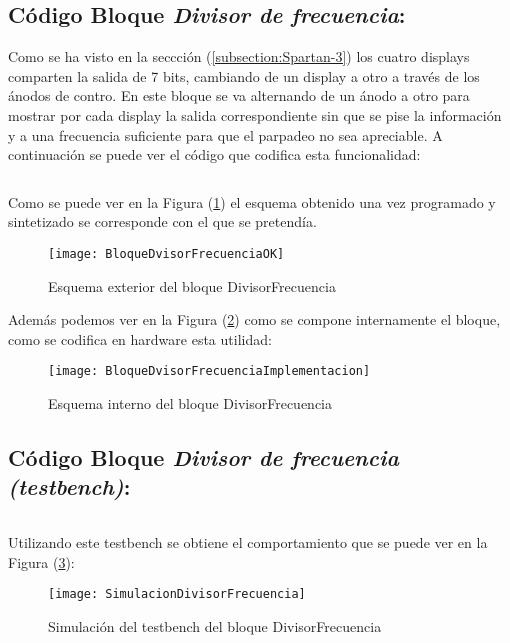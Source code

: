 \subsection{Código Bloque \textit{Divisor de frecuencia}:} \label{code:DivisorFrecuencia}
	Como se ha visto en la seccción (\ref{subsection:Spartan-3}) los cuatro displays comparten la salida de 7 bits, cambiando de un display a otro a través de los ánodos de contro. En este bloque se va alternando de un ánodo a otro para mostrar por cada display la salida correspondiente sin que se pise la información y a una frecuencia suficiente para que el parpadeo no sea apreciable. A continuación se puede ver el código que codifica esta funcionalidad: \\ 

	\inputminted[frame=lines,fontsize=\footnotesize,linenos]{vhdl}{CodeFiles/DivisorFrecuencia.vhd}
	
		Como se puede ver en la Figura (\ref{fig:BloqueDivisorFrecuenciaOK}) el esquema obtenido una vez programado y sintetizado se corresponde con el que se pretendía.
    \begin{figure}[H]
		    \centering
		    \texttt{[image: BloqueDvisorFrecuenciaOK]}
		    \caption{Esquema exterior del bloque DivisorFrecuencia}
		    \label{fig:BloqueDivisorFrecuenciaOK}
	\end{figure}
    Además podemos ver en la Figura (\ref{fig:BloqueDivisorFrecuenciaImplementacion}) como se compone internamente el bloque, como se codifica en hardware esta utilidad:
    \begin{figure}[H]
		    \centering
		    \texttt{[image: BloqueDvisorFrecuenciaImplementacion]}
		    \caption{Esquema interno del bloque DivisorFrecuencia}
		    \label{fig:BloqueDivisorFrecuenciaImplementacion}
	\end{figure}

\subsection{Código Bloque \textit{Divisor de frecuencia (testbench)}:} \label{code:DivisorFrecuencia_Tb}
	\inputminted[frame=lines,fontsize=\footnotesize,linenos]{vhdl}{CodeFiles/DivisorFrecuencia_tb.vhd}
	
		Utilizando este testbench se obtiene el comportamiento que se puede ver en la Figura (\ref{fig:SimulacionDivisorFrecuencia}):

    \begin{figure}[H]
		    \centering
		    \texttt{[image: SimulacionDivisorFrecuencia]}
		    \caption{Simulación del testbench del bloque DivisorFrecuencia}
		    \label{fig:SimulacionDivisorFrecuencia}
	\end{figure}

